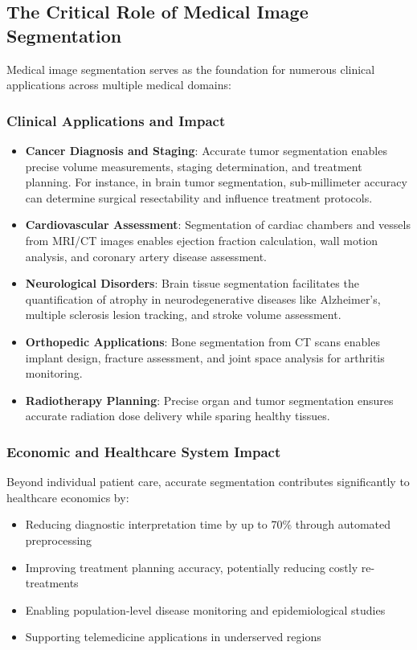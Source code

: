 \documentclass[12pt,a4paper]{article}
\begin{document}
\subsection{The Critical Role of Medical Image Segmentation}

Medical image segmentation serves as the foundation for numerous clinical applications across multiple medical domains:

\subsubsection{Clinical Applications and Impact}
\begin{itemize}
    \item \textbf{Cancer Diagnosis and Staging}: Accurate tumor segmentation enables precise volume measurements, staging determination, and treatment planning. For instance, in brain tumor segmentation, sub-millimeter accuracy can determine surgical resectability and influence treatment protocols.
    \item \textbf{Cardiovascular Assessment}: Segmentation of cardiac chambers and vessels from MRI/CT images enables ejection fraction calculation, wall motion analysis, and coronary artery disease assessment.
    \item \textbf{Neurological Disorders}: Brain tissue segmentation facilitates the quantification of atrophy in neurodegenerative diseases like Alzheimer's, multiple sclerosis lesion tracking, and stroke volume assessment.
    \item \textbf{Orthopedic Applications}: Bone segmentation from CT scans enables implant design, fracture assessment, and joint space analysis for arthritis monitoring.
    \item \textbf{Radiotherapy Planning}: Precise organ and tumor segmentation ensures accurate radiation dose delivery while sparing healthy tissues.
\end{itemize}

\subsubsection{Economic and Healthcare System Impact}
Beyond individual patient care, accurate segmentation contributes significantly to healthcare economics by:
\begin{itemize}
    \item Reducing diagnostic interpretation time by up to 70\% through automated preprocessing
    \item Improving treatment planning accuracy, potentially reducing costly re-treatments
    \item Enabling population-level disease monitoring and epidemiological studies
    \item Supporting telemedicine applications in underserved regions
\end{itemize}
\end{document}
